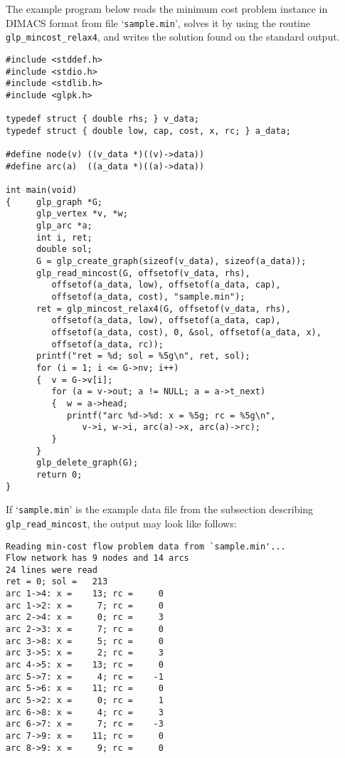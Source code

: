 \documentclass[11pt]{report}
\def\para#1{\noindent{\bf#1}}
\begin{document}
\para{Example}

The example program below reads the minimum cost problem instance in
DIMACS format from file `\verb|sample.min|', solves it by using the
routine \verb|glp_mincost_relax4|, and writes the solution found on the
standard output.

\begin{footnotesize}
\begin{verbatim}
#include <stddef.h>
#include <stdio.h>
#include <stdlib.h>
#include <glpk.h>

typedef struct { double rhs; } v_data;
typedef struct { double low, cap, cost, x, rc; } a_data;

#define node(v) ((v_data *)((v)->data))
#define arc(a)  ((a_data *)((a)->data))

int main(void)
{     glp_graph *G;
      glp_vertex *v, *w;
      glp_arc *a;
      int i, ret;
      double sol;
      G = glp_create_graph(sizeof(v_data), sizeof(a_data));
      glp_read_mincost(G, offsetof(v_data, rhs),
         offsetof(a_data, low), offsetof(a_data, cap),
         offsetof(a_data, cost), "sample.min");
      ret = glp_mincost_relax4(G, offsetof(v_data, rhs),
         offsetof(a_data, low), offsetof(a_data, cap),
         offsetof(a_data, cost), 0, &sol, offsetof(a_data, x),
         offsetof(a_data, rc));
      printf("ret = %d; sol = %5g\n", ret, sol);
      for (i = 1; i <= G->nv; i++)
      {  v = G->v[i];
         for (a = v->out; a != NULL; a = a->t_next)
         {  w = a->head;
            printf("arc %d->%d: x = %5g; rc = %5g\n",
               v->i, w->i, arc(a)->x, arc(a)->rc);
         }
      }
      glp_delete_graph(G);
      return 0;
}
\end{verbatim}
\end{footnotesize}

If `\verb|sample.min|' is the example data file from the subsection
describing \verb|glp_read_mincost|, the output may look like follows:

\begin{footnotesize}
\begin{verbatim}
Reading min-cost flow problem data from `sample.min'...
Flow network has 9 nodes and 14 arcs
24 lines were read
ret = 0; sol =   213
arc 1->4: x =    13; rc =     0
arc 1->2: x =     7; rc =     0
arc 2->4: x =     0; rc =     3
arc 2->3: x =     7; rc =     0
arc 3->8: x =     5; rc =     0
arc 3->5: x =     2; rc =     3
arc 4->5: x =    13; rc =     0
arc 5->7: x =     4; rc =    -1
arc 5->6: x =    11; rc =     0
arc 5->2: x =     0; rc =     1
arc 6->8: x =     4; rc =     3
arc 6->7: x =     7; rc =    -3
arc 7->9: x =    11; rc =     0
arc 8->9: x =     9; rc =     0
\end{verbatim}
\end{footnotesize}
\end{document}
